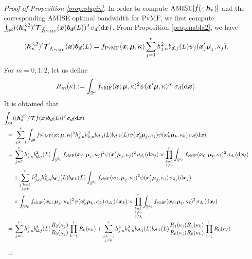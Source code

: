 \documentclass[oneside,11pt]{article}
\begin{document}
\begin{proof}[Proof of Proposition \ref{prop:plugin}]
In order to compute $\mathrm{AMISE}[\hat{f}(\cdot;{\boldsymbol{h}}_n)]$ and the corresponding AMISE optimal bandwidth for $\mathrm{PvMF}$, we first compute $\int_{\mathbb{S}^{\boldsymbol{d}}}(({\boldsymbol{h}}_n^{\odot 2})'\boldsymbol{\mathcal{T}}_{\bar{f}_{\mathrm{PvMF}}}(\boldsymbol{x})\boldsymbol{b}_{\boldsymbol{d}}(L))^2\,\sigma_{\boldsymbol{d}}(\mathrm{d}\boldsymbol{x})$. From Proposition \ref{prop:nabla2}, we have
\begin{align*}
    ({\boldsymbol{h}}_n^{\odot 2})'\boldsymbol{\mathcal{T}}_{\bar{f}_{\mathrm{PvMF}}}(\boldsymbol{x})\boldsymbol{b}_{\boldsymbol{d}}(L)=f_{\mathrm{PvMF}}(\boldsymbol{x};\boldsymbol\mu,\boldsymbol\kappa)\sum_{j=1}^rh_{j,n}^2b_{\boldsymbol{d},j}(L)\psi_j(\boldsymbol{x}_j'\boldsymbol\mu_j,\kappa_j).
\end{align*}

For $m=0,1,2$, let us define
\begin{align*}
    R_m(\kappa):=\int_{\mathbb{S}^{d}} f_{\mathrm{vMF}}(\boldsymbol{x};\boldsymbol\mu,\kappa)^2 \psi(\boldsymbol{x}'\boldsymbol\mu,\kappa)^m\,\sigma_{d}(\mathrm{d}\boldsymbol{x}).
\end{align*}
It is obtained that
\begin{align*}
   \int_{\Sr}&((\bh_n^{\odot 2})'\bT\bar{f}(\bx)\bb_{\bd}(L))^2\,\sigmar(\rd\bx)\\
    =&\;\sum_{j,k=1}^r\int_{\Sr} f_{\mathrm{PvMF}}(\bx;\bmu,\bkappa)^2h_{j,n}^2h_{k,n}^2b_{\bd,j}(L)b_{\bd,k}(L) \psi(\bx_j'\bmu_j,\kappa_j)\psi(\bx_k'\bmu_k,\kappa_k)\,\sigmar(\rd\bx)\\
    =&\;\sum_{j=1}^rh_{j,n}^4b^2_{\bd,j}(L)\int_{\Sj} f_{\mathrm{vMF}}(\bx_j;\bmu_j,\kappa_j)^2 \psi(\bx_j'\bmu_j,\kappa_j)^2\,\sigmaj(\rd\bx_j)\times \prod_{\substack{\ell=1\\\ell\neq j}}^r \int_{\Sell} f_{\mathrm{vMF}}(\bx_\ell;\bmu_\ell,\kappa_\ell)^2 \,\sigmaell(\rd\bx_\ell)\\
    &+\sum_{\substack{j,k=1\\j\neq k}}^rh_{j,n}^2h_{k,n}^2b_{\bd,j}(L)b_{\bd,k}(L)\int_{\Sj} f_{\mathrm{vMF}}(\bx_j;\bmu_j,\kappa_j)^2 \psi(\bx_j'\bmu_j,\kappa_j)\, \sigmaj(\rd\bx_j)\\
    &\times\int_{\Sk} f_{\mathrm{vMF}}(\bx_k;\bmu_k,\kappa_k)^2 \psi(\bx_k'\bmu_k,\kappa_k)\, \sigmak(\rd\bx_k)
    \times\prod_{\substack{\ell=1\\\ell\neq j\\\ell\neq k}}^{r}\int_{\Sell} f_{\mathrm{vMF}}(\bx_\ell;\bmu_\ell,\kappa_\ell)^2\,\sigmaell(\rd\bx_\ell)\\
    =&\;\sum_{j=1}^rh_{j,n}^4b^2_{\bd,j}(L)\frac{R_2(\kappa_j)}{R_0(\kappa_j)}\prod_{k=1}^r R_0(\kappa_k)+\sum_{\substack{j,k=1\\j\neq k}}^rh_{j,n}^2h_{k,n}^2b_{\bd,j}(L)b_{\bd,k}(L)\frac{R_1(\kappa_j) R_1(\kappa_k)}{R_0(\kappa_j) R_0(\kappa_k)}\prod_{\ell=1}^{r} R_0(\kappa_\ell)\\

\end{align*}
\end{proof}
\end{document}
